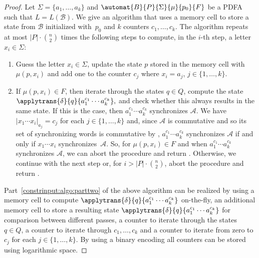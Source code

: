 \begin{proof}
 Let $\Sigma = \{a_1, \ldots, a_k\}$ and $\automat{B}{P}{\Sigma}{\mu}{p_0}{F}$
 be a PDFA such that $L = L(\mathcal B)$.
 We give an algorithm that uses a memory cell to store a state from $\mathcal B$ initialized with~$p_0$
 and $k$ counters $c_1, \ldots, c_k$.
 The algorithm %
 repeats at most $|P| \cdot \binom{n}{2}$ times the following steps
 to compute, in the $i$-th step, a letter $x_i \in \Sigma$:
 \begin{enumerate}
 \item  Guess the letter $x_i \in \Sigma$,
 update the state $p$ stored in the memory cell with $\mu(p, x_i)$
 and add one to the counter $c_j$ where $x_i = a_j$, $j \in \{1,\ldots,k\}$.
 	
 \item \label{constrinput:algo:parttwo} If $\mu(p, x_i) \in F$,
 then iterate through the states $q \in Q$,
 compute the state
 $
 \applytrans{\delta}{q}{a_1^{c_1} \cdots a_k^{c_k}},
 $
 and check whether this always results
 in the same state. 
 If this is the case,
 then $a_1^{c_1}\cdots a_k^{c_k}$
 synchronizes $\mathcal A$.
 We have %
 $|x_1 \cdots x_i|_{a_j} = c_j$ for each $j \in \{1,\ldots,k\}$
 and, since $\mathcal A$ is commutative and so its set of synchronizing
 words is commutative by 
 ,
 $a_1^{c_1}\cdots a_k^{c_k}$
 synchronizes $\mathcal A$ if and only if $x_1 \cdots x_i$ synchronizes~$\mathcal A$.
 So, for $\mu(p, x_i) \in F$ and when $a_1^{c_1} \cdots a_k^{c_k}$
 synchronizes $\mathcal A$, we can abort the procedure and return \rYES.
 Otherwise, we continue with the next step or, for $i > |P| \cdot \binom{n}{2}$,
 abort the procedure and return \rNO. 
\end{enumerate}
 
 Part~\ref{constrinput:algo:parttwo} of the above algorithm
 can be realized by using a memory cell to compute $\applytrans{\delta}{q}{a_1^{c_1} \cdots a_k^{c_k}}$
 on-the-fly, an additional memory cell
 to store a resulting state $\applytrans{\delta}{q}{a_1^{c_1} \cdots a_k^{c_k}}$
 for comparison between different passes,
 a counter to iterate through the states $q \in Q$,
 a counter to iterate through $c_1, \ldots, c_k$
 and a counter to iterate from zero to $c_j$ for each $j \in \{1,\ldots,k\}$.
 By using a binary encoding all counters can
 be stored using logarithmic space.
 

\end{proof}
